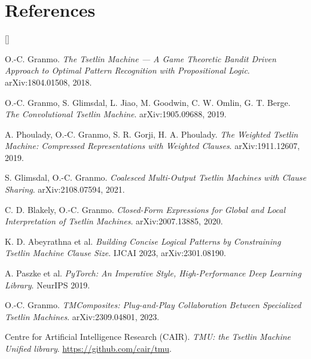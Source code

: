 \documentclass[10.5pt,a4paper]{article}
\begin{document}
\section*{References}
{\small\sloppy
\setlength{\parskip}{0.15em}
\begin{list}{\textcolor{ttorange}{[]}}%
  {\setlength{\leftmargin}{2.1em}\setlength{\labelwidth}{1.7em}%
   \setlength{\labelsep}{0.4em}\setlength{\itemsep}{0.15em}\setlength{\topsep}{0.3em}}
\item O.-C. Granmo. \emph{The Tsetlin Machine --- A Game Theoretic Bandit Driven Approach to
  Optimal Pattern Recognition with Propositional Logic}. arXiv:1804.01508, 2018.
\item O.-C. Granmo, S. Glimsdal, L. Jiao, M. Goodwin, C. W. Omlin, G. T. Berge.
  \emph{The Convolutional Tsetlin Machine}. arXiv:1905.09688, 2019.
\item A. Phoulady, O.-C. Granmo, S. R. Gorji, H. A. Phoulady. \emph{The Weighted Tsetlin
  Machine: Compressed Representations with Weighted Clauses}. arXiv:1911.12607, 2019.
\item S. Glimsdal, O.-C. Granmo. \emph{Coalesced Multi-Output Tsetlin Machines with Clause
  Sharing}. arXiv:2108.07594, 2021.
\item C. D. Blakely, O.-C. Granmo. \emph{Closed-Form Expressions for Global and Local
  Interpretation of Tsetlin Machines}. arXiv:2007.13885, 2020.
\item K. D. Abeyrathna et al. \emph{Building Concise Logical Patterns by Constraining Tsetlin
  Machine Clause Size}. IJCAI 2023, arXiv:2301.08190.
\item A. Paszke et al. \emph{PyTorch: An Imperative Style, High-Performance Deep Learning
  Library}. NeurIPS 2019.
\item O.-C. Granmo. \emph{TMComposites: Plug-and-Play Collaboration Between Specialized
  Tsetlin Machines}. arXiv:2309.04801, 2023.
\item Centre for Artificial Intelligence Research (CAIR). \emph{TMU: the Tsetlin Machine
  Unified library}. \url{https://github.com/cair/tmu}.
\end{list}}
\end{document}
